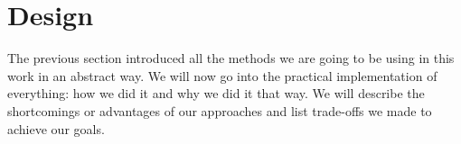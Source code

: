 \section{Design}

The previous section introduced all the methods we are going to be
using in this work in an abstract way. We will now go into the
practical implementation of everything: how we did it and why we did
it that way. We will describe the shortcomings or advantages of our
approaches and list trade-offs we made to achieve our goals.











